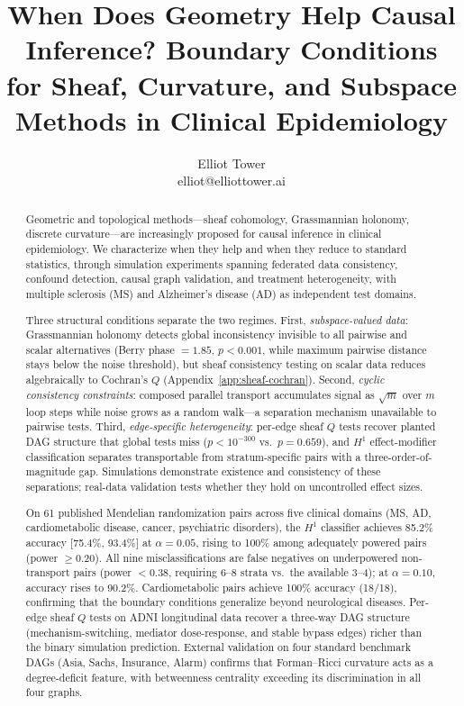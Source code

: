 \documentclass{article}
\title{When Does Geometry Help Causal Inference? Boundary Conditions for Sheaf, Curvature, and Subspace Methods in Clinical Epidemiology}
\author{\name Elliot Tower \\
      \email elliot@elliottower.ai}
\begin{document}
\maketitle

\begin{abstract}
Geometric and topological methods---sheaf cohomology, Grassmannian holonomy, discrete curvature---are increasingly proposed for causal inference in clinical epidemiology. We characterize when they help and when they reduce to standard statistics, through simulation experiments spanning federated data consistency, confound detection, causal graph validation, and treatment heterogeneity, with multiple sclerosis (MS) and Alzheimer's disease (AD) as independent test domains.

Three structural conditions separate the two regimes. First, \emph{subspace-valued data}: Grassmannian holonomy detects global inconsistency invisible to all pairwise and scalar alternatives (Berry phase $= 1.85$, $p < 0.001$, while maximum pairwise distance stays below the noise threshold), but sheaf consistency testing on scalar data reduces algebraically to Cochran's $Q$ (Appendix~\ref{app:sheaf-cochran}). Second, \emph{cyclic consistency constraints}: composed parallel transport accumulates signal as $\sqrt{m}$ over $m$ loop steps while noise grows as a random walk---a separation mechanism unavailable to pairwise tests. Third, \emph{edge-specific heterogeneity}: per-edge sheaf $Q$ tests recover planted DAG structure that global tests miss ($p < 10^{-300}$ vs.\ $p = 0.659$), and $H^1$ effect-modifier classification separates transportable from stratum-specific pairs with a three-order-of-magnitude gap. Simulations demonstrate existence and consistency of these separations; real-data validation tests whether they hold on uncontrolled effect sizes.

On 61 published Mendelian randomization pairs across five clinical domains (MS, AD, cardiometabolic disease, cancer, psychiatric disorders), the $H^1$ classifier achieves 85.2\% accuracy [75.4\%, 93.4\%] at $\alpha = 0.05$, rising to 100\% among adequately powered pairs (power $\geq 0.20$). All nine misclassifications are false negatives on underpowered non-transport pairs (power $< 0.38$, requiring 6--8 strata vs.\ the available 3--4); at $\alpha = 0.10$, accuracy rises to 90.2\%. Cardiometabolic pairs achieve 100\% accuracy (18/18), confirming that the boundary conditions generalize beyond neurological diseases. Per-edge sheaf $Q$ tests on ADNI longitudinal data recover a three-way DAG structure (mechanism-switching, mediator dose-response, and stable bypass edges) richer than the binary simulation prediction. External validation on four standard benchmark DAGs (Asia, Sachs, Insurance, Alarm) confirms that Forman--Ricci curvature acts as a degree-deficit feature, with betweenness centrality exceeding its discrimination in all four graphs.


\end{abstract}
\end{document}
